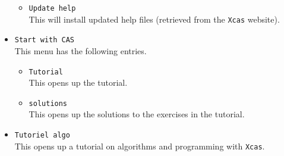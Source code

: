 \documentclass[a4paper,11pt]{book}
\begin{document}
\begin{itemize}
\begin{itemize}
    
    
    
    
    
    
    
    \item \texttt{Update help}\\
    This will install updated help files (retrieved from the
    \texttt{Xcas} website).
  \end{itemize}

  \item \texttt{Start with CAS}\\
  This menu has the following entries.

  \begin{itemize}
    \item \texttt{Tutorial}\\
    This opens up the tutorial.
    
    \item \texttt{solutions}\\
    This opens up the solutions to the exercises in the tutorial.
  \end{itemize}
  
  \item \texttt{Tutoriel algo}\\
  This opens up a tutorial on algorithms and programming with
  \texttt{Xcas}.
  

\end{itemize}
\end{document}
